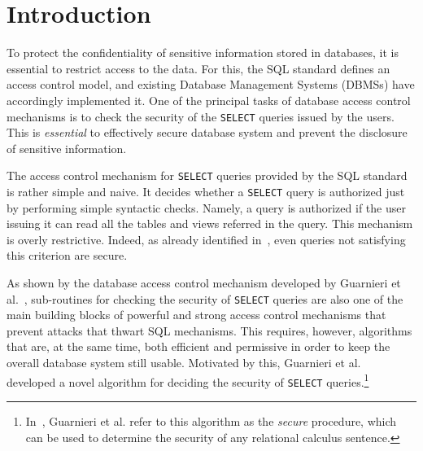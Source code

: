 \section{Introduction}




To protect the confidentiality of sensitive information stored in databases, it is essential to restrict access to the data.
%
For this, the SQL standard defines an access control model, and existing Database Management Systems (DBMSs) have accordingly implemented it. 
%
One of the principal tasks of database access control mechanisms is to check the security of the \texttt{SELECT} queries issued by the users.
%
This is \emph{essential} to effectively secure database system and prevent the disclosure of sensitive information.
%

The access control mechanism for \texttt{SELECT} queries provided by the SQL standard is rather simple and naive.
%
It decides whether a \texttt{SELECT} query is authorized just by performing simple syntactic checks.
%
Namely, a query is authorized if the user issuing it can read all the tables and views referred in the query.
%
This mechanism  is overly restrictive.
%
Indeed, as already identified in~\cite{...}, even queries not satisfying this criterion are secure.
%   

As shown by the database access control mechanism developed by Guarnieri et al.~\cite{guarnieri2016strong}, sub-routines for checking the security of \texttt{SELECT} queries are also one of the main building blocks of powerful and strong access control mechanisms that prevent attacks that thwart SQL mechanisms.
%
This requires, however, algorithms that are, at the same time, both efficient and permissive in order to keep the overall database system still usable.
%
Motivated by this,  Guarnieri et al.~\cite{guarnieri2016strong} developed a novel algorithm for deciding the security of \texttt{SELECT} queries.\footnote{In~\cite{guarnieri2016strong}, Guarnieri et al. refer to this algorithm as the \emph{secure} procedure, which can be used to determine the security of any relational calculus sentence.} 


